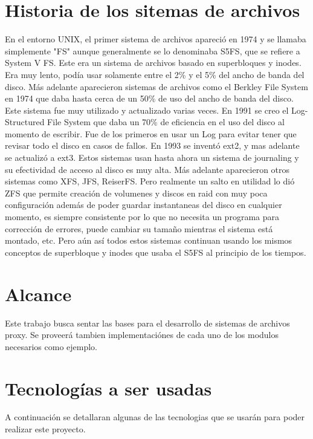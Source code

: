 \section{Historia de los sitemas de archivos}
\label{historia}

En el entorno UNIX, el primer sistema de archivos apareció en 1974 y se llamaba simplemente "FS" aunque generalmente se lo denominaba S5FS, que se refiere a System V FS. Este era un sistema de archivos basado en superbloques y inodes. Era muy lento, podía usar solamente entre el 2\% y el 5\% del ancho de banda del disco. Más adelante aparecieron sistemas de archivos como el Berkley File System en 1974 que daba hasta cerca de un 50\% de uso del ancho de banda del disco. Este sistema fue muy utilizado y actualizado varias veces. En 1991 se creo el Log-Structured File System que daba un 70\% de eficiencia en el uso del disco al momento de escribir. Fue de los primeros en usar un Log para evitar tener que revisar todo el disco en casos de fallos. En 1993 se inventó ext2, y mas adelante se actualizó a ext3. Estos sistemas usan hasta ahora un sistema de journaling y su efectividad de acceso al disco es muy alta. Más adelante aparecieron otros sistemas como XFS, JFS, ReiserFS. Pero realmente un salto en utilidad lo dió ZFS que permite creación de volumenes y discos en raid con muy poca configuración además de poder guardar instantaneas del disco en cualquier momento, es siempre consistente por lo que no necesita un programa para corrección de errores, puede cambiar su tamaño mientras el sistema está montado, etc. Pero aún así todos estos sistemas continuan usando los mismos conceptos de superbloque y inodes que usaba el S5FS al principio de los tiempos.


\section{Alcance}
\label{alcance}

Este trabajo busca sentar las bases para el desarrollo de sistemas de archivos proxy. Se proveerá tambien implementaciónes de cada uno de los modulos necesarios como ejemplo.


\section{Tecnologías a ser usadas}
\label{tecnologías}

A continuación se detallaran algunas de las tecnologias que se usarán para poder realizar este proyecto.

